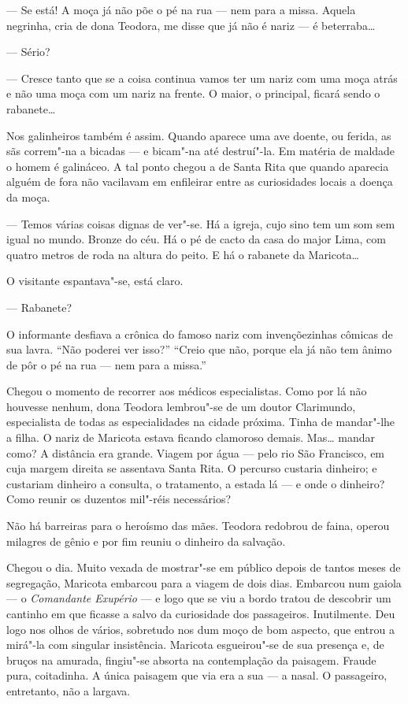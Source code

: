 --- Se está! A moça já não põe o pé na rua --- nem para a missa. Aquela
negrinha, cria de dona Teodora, me disse que já não é nariz --- é
beterraba\ldots{}

--- Sério?

--- Cresce tanto que se a coisa continua vamos ter um nariz com uma moça
atrás e não uma moça com um nariz na frente. O maior, o principal,
ficará sendo o rabanete\ldots{}

Nos galinheiros também é assim. Quando aparece uma ave doente, ou
ferida, as sãs correm"-na a bicadas --- e bicam"-na até destruí"-la. Em
matéria de maldade o homem é galináceo. A tal ponto chegou a de Santa
Rita que quando aparecia alguém de fora não vacilavam em enfileirar
entre as curiosidades locais a doença da moça.

--- Temos várias coisas dignas de ver"-se. Há a igreja, cujo sino tem um
som sem igual no mundo. Bronze do céu. Há o pé de cacto da casa do major
Lima, com quatro metros de roda na altura do peito. E há o rabanete da
Maricota\ldots{}

O visitante espantava"-se, está claro.

--- Rabanete?

O informante desfiava a crônica do famoso nariz com invençõezinhas
cômicas de sua lavra. ``Não poderei ver isso?'' ``Creio que não, porque
ela já não tem ânimo de pôr o pé na rua --- nem para a missa.''

Chegou o momento de recorrer aos médicos especialistas. Como por lá não
houvesse nenhum, dona Teodora lembrou"-se de um doutor Clarimundo,
especialista de todas as especialidades na cidade próxima. Tinha de
mandar"-lhe a filha. O nariz de Maricota estava ficando clamoroso demais.
Mas\ldots{} mandar como? A distância era grande. Viagem por água --- pelo rio
São Francisco, em cuja margem direita se assentava Santa Rita. O
percurso custaria dinheiro; e custariam dinheiro a consulta, o
tratamento, a estada lá --- e onde o dinheiro? Como reunir os duzentos
mil"-réis necessários?

Não há barreiras para o heroísmo das mães. Teodora redobrou de faina,
operou milagres de gênio e por fim reuniu o dinheiro da salvação.

Chegou o dia. Muito vexada de mostrar"-se em público depois de tantos
meses de segregação, Maricota embarcou para a viagem de dois dias.
Embarcou num gaiola --- o \emph{Comandante Exupério} --- e logo que se
viu a bordo tratou de descobrir um cantinho em que ficasse a salvo da
curiosidade dos passageiros. Inutilmente. Deu logo nos olhos de vários,
sobretudo nos dum moço de bom aspecto, que entrou a mirá"-la com singular
insistência. Maricota esgueirou"-se de sua presença e, de bruços na
amurada, fingiu"-se absorta na contemplação da paisagem. Fraude pura,
coitadinha. A única paisagem que via era a sua --- a nasal. O
passageiro, entretanto, não a largava.

